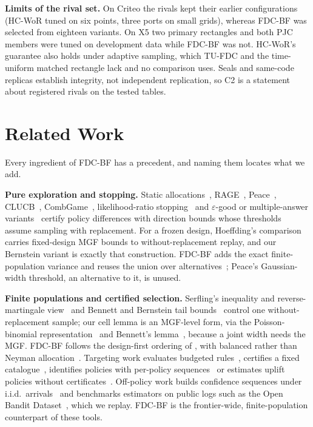 \documentclass[sigconf,anonymous,review]{acmart}
\newcommand{\eps}{\varepsilon}
\begin{document}
\textbf{Limits of the rival set.} On Criteo the rivals kept their earlier configurations (HC-WoR tuned on six points, three ports on small grids), whereas FDC-BF was selected from eighteen variants. On X5 two primary rectangles and both PJC members were tuned on development data while FDC-BF was not. HC-WoR's guarantee also holds under adaptive sampling, which TU-FDC and the time-uniform matched rectangle lack and no comparison uses. Seals and same-code replicas establish integrity, not independent replication, so C2 is a statement about registered rivals on the tested tables.

\section{Related Work}\label{sec:related}

Every ingredient of FDC-BF has a precedent, and naming them locates what we add.

\textbf{Pure exploration and stopping.} Static allocations~\citep{soare2014best}, RAGE~\citep{fiez2019sequential}, Peace~\citep{katzsamuels2020empirical}, CLUCB~\citep{chen2014combinatorial,chen2017nearly}, CombGame~\citep{jourdan2021efficient}, likelihood-ratio stopping~\citep{garivier2016optimal} and $\eps$-good or multiple-answer variants~\citep{degenne2019pure,jourdan2022choosing,jamieson2018bandit} certify policy differences with direction bounds whose thresholds assume sampling with replacement. For a frozen design, Hoeffding's comparison~\citep{hoeffding1963probability} carries fixed-design MGF bounds to without-replacement replay, and our Bernstein variant is exactly that construction. FDC-BF adds the exact finite-population variance and reuses the union over alternatives~\citep{deheide2026union}; Peace's Gaussian-width threshold, an alternative to it, is unused.

\textbf{Finite populations and certified selection.} Serfling's inequality and reverse-martingale view~\citep{serfling1974probability,bardenet2015concentration} and Bennett and Bernstein tail bounds~\citep{greene2017exponential} control one without-replacement sample; our cell lemma is an MGF-level form, via the Poisson-binomial representation~\citep{vatutin1982limit,tang2023poisson} and Bennett's lemma~\citep{bennett1962probability}, because a joint width needs the MGF. FDC-BF follows the design-first ordering of \citet{hait2026target}, with balanced rather than Neyman allocation~\citep{neyman1934two,kato2024generalized,dang2026target}. Targeting work evaluates budgeted rules~\citep{imai2023experimental,li2024neyman}, certifies a fixed catalogue~\citep{shekhar2026support}, identifies policies with per-policy sequences~\citep{molitor2026anytime} or estimates uplift policies without certificates~\citep{sverdrup2023qini,athey2021policy}. Off-policy work builds confidence sequences under i.i.d.\ arrivals~\citep{karampatziakis2021off,waudbysmith2024anytime,thomas2015high,cho2024cspimt} and benchmarks estimators on public logs such as the Open Bandit Dataset~\citep{saito2021open}, which we replay. FDC-BF is the frontier-wide, finite-population counterpart of these tools.
\end{document}
